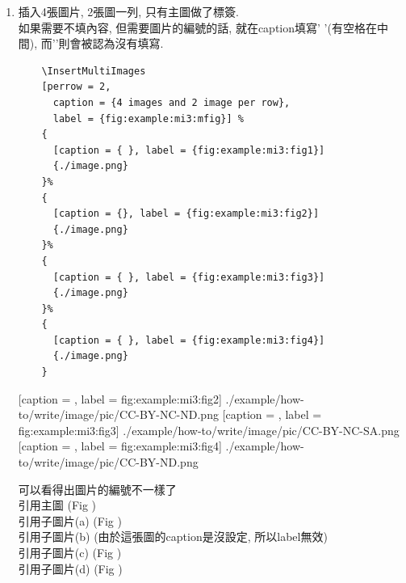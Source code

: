 \begin{enumerate}
{    e.g: 
    引用主圖 (Fig ) ,
    引用子圖片 (Fig , Fig ).
  } %

  \newpage
  \item
  {
    插入4張圖片, 2張圖一列, 只有主圖做了標簽.\\
    如果需要不填內容, 但需要圖片的編號的話, 就在caption填寫'{ }'(有空格在中間), 而'{}'則會被認為沒有填寫.
    \begin{verbatim}
    \InsertMultiImages
    [perrow = 2,
      caption = {4 images and 2 image per row},
      label = {fig:example:mi3:mfig}] %
    {
      [caption = { }, label = {fig:example:mi3:fig1}]
      {./image.png}
    }%
    {
      [caption = {}, label = {fig:example:mi3:fig2}]
      {./image.png}
    }%
    {
      [caption = { }, label = {fig:example:mi3:fig3}]
      {./image.png}
    }%
    {
      [caption = { }, label = {fig:example:mi3:fig4}]
      {./image.png}
    }
    \end{verbatim}

    {
      [caption = {},
      label = {fig:example:mi3:fig2}]
      {./example/how-to/write/image/pic/CC-BY-NC-ND.png}
    }%
    {
      [caption = { },
      label = {fig:example:mi3:fig3}]
      {./example/how-to/write/image/pic/CC-BY-NC-SA.png}
    }%
    {
      [caption = { },
      label = {fig:example:mi3:fig4}]
      {./example/how-to/write/image/pic/CC-BY-ND.png}
    }

    可以看得出圖片的編號不一樣了\\
    引用主圖 (Fig )\\
    引用子圖片(a) (Fig )\\
    引用子圖片(b) (由於這張圖的caption是沒設定, 所以label無效)\\
    引用子圖片(c) (Fig )\\
    引用子圖片(d) (Fig )
  } %


\end{enumerate}

